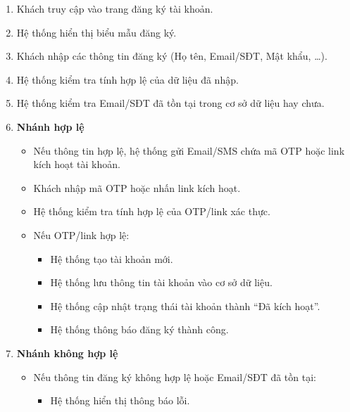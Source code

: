 \begin{enumerate}
    \item Khách truy cập vào trang đăng ký tài khoản.
    
    \item Hệ thống hiển thị biểu mẫu đăng ký.
    
    \item Khách nhập các thông tin đăng ký (Họ tên, Email/SĐT, Mật khẩu, \ldots).
    
    \item Hệ thống kiểm tra tính hợp lệ của dữ liệu đã nhập.
    
    \item Hệ thống kiểm tra Email/SĐT đã tồn tại trong cơ sở dữ liệu hay chưa.

    \item \textbf{Nhánh hợp lệ}
    \begin{itemize}
        \item Nếu thông tin hợp lệ, hệ thống gửi Email/SMS chứa mã OTP hoặc link kích hoạt tài khoản.
        
        \item Khách nhập mã OTP hoặc nhấn link kích hoạt.
        
        \item Hệ thống kiểm tra tính hợp lệ của OTP/link xác thực.
        
        \item Nếu OTP/link hợp lệ:
        \begin{itemize}
            \item Hệ thống tạo tài khoản mới.
            
            \item Hệ thống lưu thông tin tài khoản vào cơ sở dữ liệu.
            
            \item Hệ thống cập nhật trạng thái tài khoản thành ``Đã kích hoạt''.
            
            \item Hệ thống thông báo đăng ký thành công.
        \end{itemize}
    \end{itemize}

    \item \textbf{Nhánh không hợp lệ}
    \begin{itemize}
        \item Nếu thông tin đăng ký không hợp lệ hoặc Email/SĐT đã tồn tại:
        \begin{itemize}
            \item Hệ thống hiển thị thông báo lỗi.
            

\end{itemize}
\end{itemize}
\end{enumerate}
